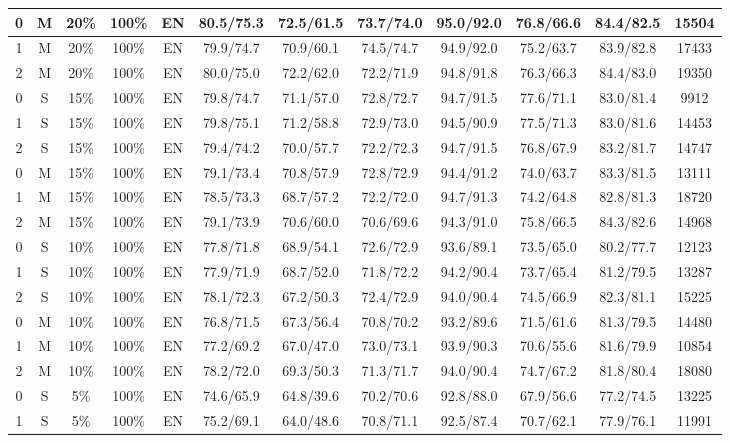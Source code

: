 \begin{table*}
{\begin{tabular}{|c|c|c|c|c||c|c|c|c|c|c||c|}
0 & M & 20\% & 100\% & EN & 80.5/75.3 & 72.5/61.5 & 73.7/74.0 & 95.0/92.0 & 76.8/66.6 & 84.4/82.5 & 15504 \\ \hline
1 & M & 20\% & 100\% & EN & 79.9/74.7 & 70.9/60.1 & 74.5/74.7 & 94.9/92.0 & 75.2/63.7 & 83.9/82.8 & 17433 \\ \hline
2 & M & 20\% & 100\% & EN & 80.0/75.0 & 72.2/62.0 & 72.2/71.9 & 94.8/91.8 & 76.3/66.3 & 84.4/83.0 & 19350 \\ \hline
0 & S & 15\% & 100\% & EN & 79.8/74.7 & 71.1/57.0 & 72.8/72.7 & 94.7/91.5 & 77.6/71.1 & 83.0/81.4 & 9912 \\ \hline
1 & S & 15\% & 100\% & EN & 79.8/75.1 & 71.2/58.8 & 72.9/73.0 & 94.5/90.9 & 77.5/71.3 & 83.0/81.6 & 14453 \\ \hline
2 & S & 15\% & 100\% & EN & 79.4/74.2 & 70.0/57.7 & 72.2/72.3 & 94.7/91.5 & 76.8/67.9 & 83.2/81.7 & 14747 \\ \hline
0 & M & 15\% & 100\% & EN & 79.1/73.4 & 70.8/57.9 & 72.8/72.9 & 94.4/91.2 & 74.0/63.7 & 83.3/81.5 & 13111 \\ \hline
1 & M & 15\% & 100\% & EN & 78.5/73.3 & 68.7/57.2 & 72.2/72.0 & 94.7/91.3 & 74.2/64.8 & 82.8/81.3 & 18720 \\ \hline
2 & M & 15\% & 100\% & EN & 79.1/73.9 & 70.6/60.0 & 70.6/69.6 & 94.3/91.0 & 75.8/66.5 & 84.3/82.6 & 14968 \\ \hline
0 & S & 10\% & 100\% & EN & 77.8/71.8 & 68.9/54.1 & 72.6/72.9 & 93.6/89.1 & 73.5/65.0 & 80.2/77.7 & 12123 \\ \hline
1 & S & 10\% & 100\% & EN & 77.9/71.9 & 68.7/52.0 & 71.8/72.2 & 94.2/90.4 & 73.7/65.4 & 81.2/79.5 & 13287 \\ \hline
2 & S & 10\% & 100\% & EN & 78.1/72.3 & 67.2/50.3 & 72.4/72.9 & 94.0/90.4 & 74.5/66.9 & 82.3/81.1 & 15225 \\ \hline
0 & M & 10\% & 100\% & EN & 76.8/71.5 & 67.3/56.4 & 70.8/70.2 & 93.2/89.6 & 71.5/61.6 & 81.3/79.5 & 14480 \\ \hline
1 & M & 10\% & 100\% & EN & 77.2/69.2 & 67.0/47.0 & 73.0/73.1 & 93.9/90.3 & 70.6/55.6 & 81.6/79.9 & 10854 \\ \hline
2 & M & 10\% & 100\% & EN & 78.2/72.0 & 69.3/50.3 & 71.3/71.7 & 94.0/90.4 & 74.7/67.2 & 81.8/80.4 & 18080 \\ \hline
0 & S & 5\% & 100\% & EN & 74.6/65.9 & 64.8/39.6 & 70.2/70.6 & 92.8/88.0 & 67.9/56.6 & 77.2/74.5 & 13225 \\ \hline
1 & S & 5\% & 100\% & EN & 75.2/69.1 & 64.0/48.6 & 70.8/71.1 & 92.5/87.4 & 70.7/62.1 & 77.9/76.1 & 11991 \\ \hline

\end{tabular}}
\end{table*}
